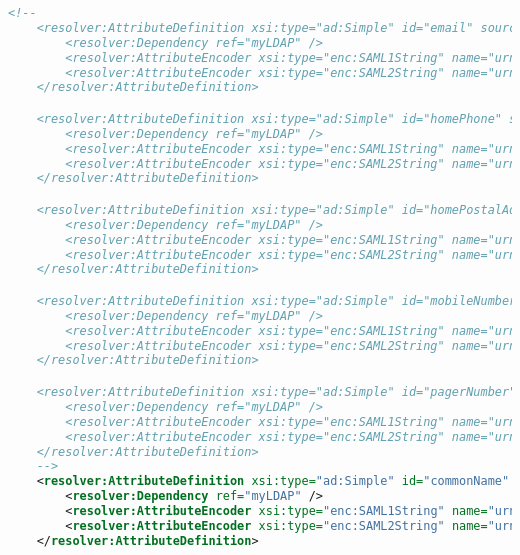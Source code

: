 \begin{lstlisting}[language=xml]
    <!--
    <resolver:AttributeDefinition xsi:type="ad:Simple" id="email" sourceAttributeID="mail">
        <resolver:Dependency ref="myLDAP" />
        <resolver:AttributeEncoder xsi:type="enc:SAML1String" name="urn:mace:dir:attribute-def:mail" />
        <resolver:AttributeEncoder xsi:type="enc:SAML2String" name="urn:oid:0.9.2342.19200300.100.1.3" friendlyName="mail" />
    </resolver:AttributeDefinition>

    <resolver:AttributeDefinition xsi:type="ad:Simple" id="homePhone" sourceAttributeID="homePhone">
        <resolver:Dependency ref="myLDAP" />
        <resolver:AttributeEncoder xsi:type="enc:SAML1String" name="urn:mace:dir:attribute-def:homePhone" />
        <resolver:AttributeEncoder xsi:type="enc:SAML2String" name="urn:oid:0.9.2342.19200300.100.1.20" friendlyName="homePhone" />
    </resolver:AttributeDefinition>

    <resolver:AttributeDefinition xsi:type="ad:Simple" id="homePostalAddress" sourceAttributeID="homePostalAddress">
        <resolver:Dependency ref="myLDAP" />
        <resolver:AttributeEncoder xsi:type="enc:SAML1String" name="urn:mace:dir:attribute-def:homePostalAddress" />
        <resolver:AttributeEncoder xsi:type="enc:SAML2String" name="urn:oid:0.9.2342.19200300.100.1.39" friendlyName="homePostalAddress" />
    </resolver:AttributeDefinition>

    <resolver:AttributeDefinition xsi:type="ad:Simple" id="mobileNumber" sourceAttributeID="mobile">
        <resolver:Dependency ref="myLDAP" />
        <resolver:AttributeEncoder xsi:type="enc:SAML1String" name="urn:mace:dir:attribute-def:mobile" />
        <resolver:AttributeEncoder xsi:type="enc:SAML2String" name="urn:oid:0.9.2342.19200300.100.1.41" friendlyName="mobile" />
    </resolver:AttributeDefinition>

    <resolver:AttributeDefinition xsi:type="ad:Simple" id="pagerNumber" sourceAttributeID="pager">
        <resolver:Dependency ref="myLDAP" />
        <resolver:AttributeEncoder xsi:type="enc:SAML1String" name="urn:mace:dir:attribute-def:pager" />
        <resolver:AttributeEncoder xsi:type="enc:SAML2String" name="urn:oid:0.9.2342.19200300.100.1.42" friendlyName="pager" />
    </resolver:AttributeDefinition>
    -->
    <resolver:AttributeDefinition xsi:type="ad:Simple" id="commonName" sourceAttributeID="cn">
        <resolver:Dependency ref="myLDAP" />
        <resolver:AttributeEncoder xsi:type="enc:SAML1String" name="urn:mace:dir:attribute-def:cn" />
        <resolver:AttributeEncoder xsi:type="enc:SAML2String" name="urn:oid:2.5.4.3" friendlyName="cn" />
    </resolver:AttributeDefinition>


\end{lstlisting}
